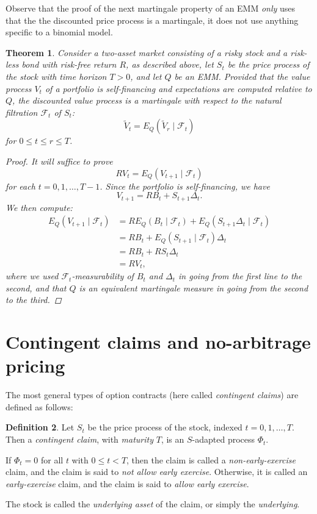 \documentclass[reqno]{amsart}
\newtheorem{thm}{Theorem}[section]
\theoremstyle{definition}
\newtheorem{defn}[thm]{Definition}
\numberwithin{equation}{section}
\begin{document}
Observe that the proof of the next martingale property of an EMM \textit{only} uses that the the discounted price process is a martingale, it does not use anything specific to a binomial model.

\begin{thm}\label{thm:value-process-martingale}
Consider a two-asset market consisting of a risky stock and a risk-less bond with risk-free return $R$, as described above, let $S_t$ be the price process of the stock with time horizon $T>0$, and let $Q$ be an EMM. Provided that the value process $V_t$ of a portfolio is self-financing and expectations are computed relative to $Q$, the discounted value process is a martingale with respect to the natural filtration $\mathcal{F}_t$ of $S_t$:
	\[
	\tilde{V}_t = E_Q ( \tilde{V}_r \mid \mathcal{F}_t )
	\]
for $0 \leq t \leq r \leq T$.

\begin{proof}
It will suffice to prove
	\[
	RV_t = E_Q\left( V_{t+1} \mid \mathcal{F}_t \right)
	\]
for each $t=0,1,\ldots,T-1$. Since the portfolio is self-financing, we have
	\[
	V_{t+1} = R B_t + S_{t+1} \Delta_t.
	\]
We then compute:
	\begin{align*}
	E_Q\left( V_{t+1} \mid \mathcal{F}_t \right) &= RE_Q(B_t \mid \mathcal{F}_t) + E_Q(S_{t+1}\Delta_t \mid \mathcal{F}_t) \\
	&= RB_t + E_Q(S_{t+1} \mid \mathcal{F}_t) \Delta_t \\
	&= RB_t + RS_t \Delta_t \\
	&= R V_t,
	\end{align*}
where we used $\mathcal{F}_t$-measurability of $B_t$ and $\Delta_t$ in going from the first line to the second, and that $Q$ is an equivalent martingale measure in going from the second to the third.
\end{proof}
\end{thm}

\section{Contingent claims and no-arbitrage pricing}\label{sec:claim-pricing}

The most general types of option contracts (here called \textit{contingent claims}) are defined as follows:

\begin{defn}
Let $S_t$ be the price process of the stock, indexed $t=0,1,\ldots,T$. Then a \textit{contingent claim}, with \textit{maturity} $T$, is an $S$-adapted process $\Phi_t$.

If $\Phi_t=0$ for all $t$ with $0 \leq t < T$, then the claim is called a \textit{non-early-exercise} claim, and the claim is said to \textit{not allow early exercise}. Otherwise, it is called an \textit{early-exercise} claim, and the claim is said to \textit{allow early exercise}.

The stock is called the \textit{underlying asset} of the claim, or simply the \textit{underlying}.
\end{defn}
\end{document}
